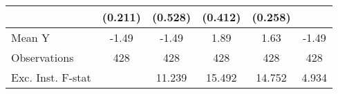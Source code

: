 {\begin{tabular}{l*{5}{c}}
            &     (0.211)         &     (0.528)         &     (0.412)         &     (0.258)         &                     \\
\midrule
Mean Y      &       -1.49         &       -1.49         &        1.89         &        1.63         &       -1.49         \\
Observations&         428         &         428         &         428         &         428         &         428         \\
Exc. Inst. F-stat&                     &      11.239         &      15.492         &      14.752         &       4.934         \\
\bottomrule
\end{tabular}
}
